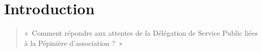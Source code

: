 \section*{Introduction}

\begin{quote}
 «~Comment répondre aux attentes de la Délégation de Service Public liées à la Pépinière d'association ?~»
\end{quote}
